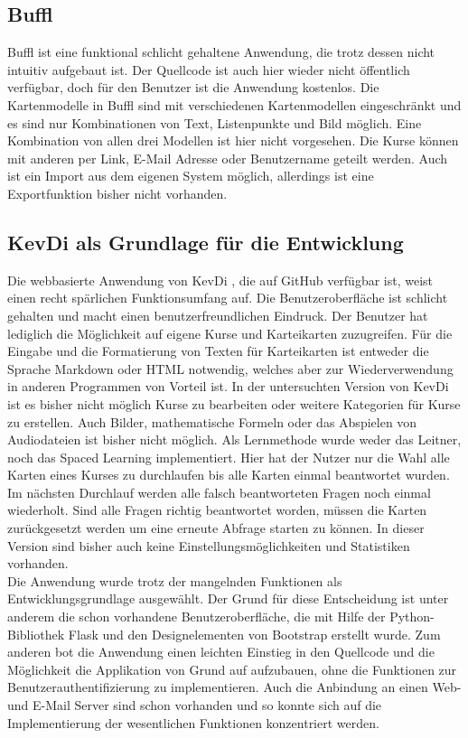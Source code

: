 \subsection{Buffl}
Buffl \cite{buffl} ist eine funktional schlicht gehaltene Anwendung, die trotz dessen nicht intuitiv aufgebaut ist. Der Quellcode ist auch hier wieder nicht öffentlich verfügbar, doch für den Benutzer ist die Anwendung kostenlos. Die Kartenmodelle in Buffl sind mit verschiedenen Kartenmodellen eingeschränkt und es sind nur Kombinationen von Text, Listenpunkte und Bild möglich. Eine Kombination von allen drei Modellen ist hier nicht vorgesehen. Die Kurse können mit anderen per Link, E-Mail Adresse oder Benutzername geteilt werden. Auch ist ein Import aus dem eigenen System möglich, allerdings ist eine Exportfunktion bisher nicht vorhanden. 

\subsection{KevDi als Grundlage für die Entwicklung}
Die webbasierte Anwendung von KevDi \cite{kevdi}, die auf GitHub verfügbar ist, weist einen recht spärlichen Funktionsumfang auf. Die Benutzeroberfläche ist schlicht gehalten und macht einen benutzerfreundlichen Eindruck. Der Benutzer hat lediglich die Möglichkeit auf eigene Kurse und Karteikarten zuzugreifen. Für die Eingabe und die Formatierung von Texten für Karteikarten ist entweder die Sprache Markdown oder HTML notwendig, welches aber zur Wiederverwendung in anderen Programmen von Vorteil ist. In der untersuchten Version von KevDi ist es bisher nicht möglich Kurse zu bearbeiten oder weitere Kategorien für Kurse zu erstellen. Auch Bilder, mathematische Formeln oder das Abspielen von Audiodateien ist bisher nicht möglich. Als Lernmethode wurde weder das Leitner, noch das Spaced Learning implementiert. Hier hat der Nutzer nur die Wahl alle Karten eines Kurses zu durchlaufen bis alle Karten einmal beantwortet wurden. Im nächsten Durchlauf werden alle falsch beantworteten Fragen noch einmal wiederholt. Sind alle Fragen richtig beantwortet worden, müssen die Karten zurückgesetzt werden um eine erneute Abfrage starten zu können. In dieser Version sind bisher auch keine Einstellungsmöglichkeiten und Statistiken vorhanden. \\

Die Anwendung wurde trotz der mangelnden Funktionen als Entwicklungsgrundlage ausgewählt. Der Grund für diese Entscheidung ist unter anderem die schon vorhandene Benutzeroberfläche, die mit Hilfe der Python-Bibliothek Flask und den Designelementen von Bootstrap erstellt wurde. Zum anderen bot die Anwendung einen leichten Einstieg in den Quellcode und die Möglichkeit die Applikation von Grund auf aufzubauen, ohne die Funktionen zur Benutzerauthentifizierung zu implementieren. Auch die Anbindung an einen Web- und E-Mail Server sind schon vorhanden und so konnte sich auf die Implementierung der wesentlichen Funktionen konzentriert werden.





